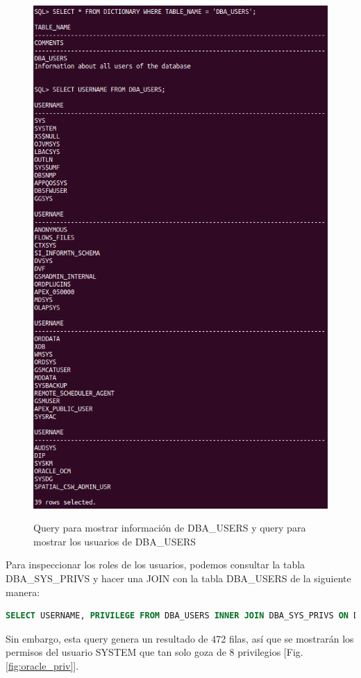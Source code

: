 \documentclass[10pt,a4paper]{article}
\begin{document}
\begin{figure}
  \centering
  \includegraphics[scale=0.6]{DBAUSERS.png}\\
  \caption{Query para mostrar información de DBA\_USERS y query para mostrar los usuarios de DBA\_USERS}
  \label{fig:oracle_dba_users}
\end{figure}

Para inspeccionar los roles de los usuarios, podemos consultar la tabla DBA\_SYS\_PRIVS y hacer una JOIN con la tabla DBA\_USERS de la siguiente manera:
\begin{lstlisting}[language=sql]
SELECT USERNAME, PRIVILEGE FROM DBA_USERS INNER JOIN DBA_SYS_PRIVS ON DBA_USERS.USERNAME = DBA_SYS_PRIVS.GRANTEE ORDER BY DBA_USERS.USERNAME;
\end{lstlisting}
Sin embargo, esta query genera un resultado de 472 filas, así que se mostrarán los permisos del usuario SYSTEM que tan solo goza de 8 privilegios [Fig. \ref{fig:oracle_priv}].
\end{document}
